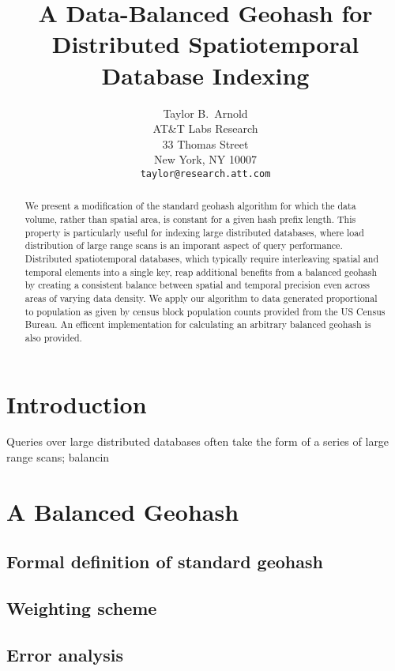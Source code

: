 \documentclass{article} %
\title{A Data-Balanced Geohash for Distributed Spatiotemporal Database Indexing}
\author{
Taylor B.~Arnold \\
AT\&T Labs Research\\
33 Thomas Street\\
New York, NY 10007 \\
\texttt{taylor@research.att.com}
}
\begin{document}
\maketitle

\begin{abstract}
We present a modification of the standard geohash algorithm
for which the data volume, rather than spatial area, is constant
for a given hash prefix length. This property is particularly
useful for indexing large distributed databases, where load
distribution of large range scans is an imporant aspect of
query performance. Distributed spatiotemporal databases, which
typically require interleaving spatial and temporal elements
into a single key, reap additional benefits from a balanced
geohash by creating a consistent balance between spatial and
temporal precision even across areas of varying data density.
We apply our algorithm to data generated proportional to population
as given by census block population counts provided from the
US Census Bureau. An efficent implementation for calculating an
arbitrary balanced geohash is also provided.
\end{abstract}

\section{Introduction}

Queries over large distributed
databases often take the form of a series of large range scans;
balancin

\section{A Balanced Geohash}

\subsection{Formal definition of standard geohash}

\subsection{Weighting scheme}

\subsection{Error analysis}
\end{document}
